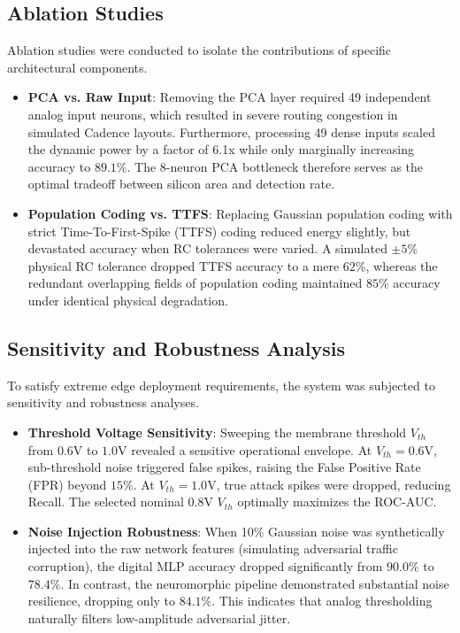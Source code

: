 \documentclass{ieeeaccess}
\begin{document}
\subsection{Ablation Studies}
Ablation studies were conducted to isolate the contributions of specific architectural components. 
\begin{itemize}
\item \textbf{PCA vs. Raw Input}: Removing the PCA layer required 49 independent analog input neurons, which resulted in severe routing congestion in simulated Cadence layouts. Furthermore, processing 49 dense inputs scaled the dynamic power by a factor of 6.1x while only marginally increasing accuracy to $89.1\%$. The 8-neuron PCA bottleneck therefore serves as the optimal tradeoff between silicon area and detection rate.
\item \textbf{Population Coding vs. TTFS}: Replacing Gaussian population coding with strict Time-To-First-Spike (TTFS) coding reduced energy slightly, but devastated accuracy when RC tolerances were varied. A simulated $\pm 5\%$ physical RC tolerance dropped TTFS accuracy to a mere $62\%$, whereas the redundant overlapping fields of population coding maintained $85\%$ accuracy under identical physical degradation.
\end{itemize}

\subsection{Sensitivity and Robustness Analysis}
To satisfy extreme edge deployment requirements, the system was subjected to sensitivity and robustness analyses. 
\begin{itemize}
\item \textbf{Threshold Voltage Sensitivity}: Sweeping the membrane threshold $V_{th}$ from $0.6$V to $1.0$V revealed a sensitive operational envelope. At $V_{th} = 0.6$V, sub-threshold noise triggered false spikes, raising the False Positive Rate (FPR) beyond $15\%$. At $V_{th} = 1.0$V, true attack spikes were dropped, reducing Recall. The selected nominal $0.8$V $V_{th}$ optimally maximizes the ROC-AUC.
\item \textbf{Noise Injection Robustness}: When 10\% Gaussian noise was synthetically injected into the raw network features (simulating adversarial traffic corruption), the digital MLP accuracy dropped significantly from $90.0\%$ to $78.4\%$. In contrast, the neuromorphic pipeline demonstrated substantial noise resilience, dropping only to $84.1\%$. This indicates that analog thresholding naturally filters low-amplitude adversarial jitter.
\end{itemize}
\end{document}
